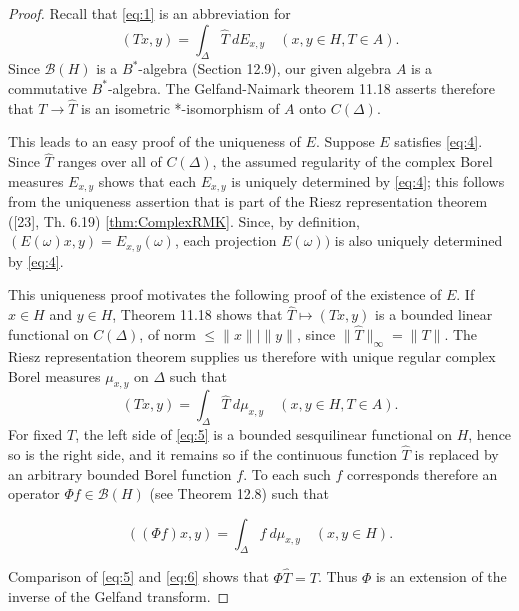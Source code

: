 \begin{proof}
  Recall that \eqref{eq:1} is an abbreviation for
  \begin{equation}
    \label{eq:4}
    (Tx , y) = \int_\Delta \widehat{T} \ dE_{x,y} \quad (x,y \in H, T \in A).
  \end{equation}
  Since $\mathcal{B}(H)$ is a $B^*$-algebra (Section 12.9), our given algebra $A$ is a commutative $B^*$-algebra.
  The Gelfand-Naimark theorem 11.18 asserts therefore that $T \to \widehat{T}$ is an isometric *-isomorphism of $A$ onto $C(\Delta)$.

  This leads to an easy proof of the uniqueness of $E$.
  Suppose $E$ satisfies \eqref{eq:4}.
  Since $\widehat{T}$ ranges over all of $C(\Delta)$, the assumed regularity of the complex Borel measures $E_{x,y}$ shows that each $E_{x,y}$ is uniquely determined by \eqref{eq:4}; this follows from the uniqueness assertion that is part of the Riesz representation theorem ([23], Th. 6.19) \ref{thm:ComplexRMK}.
  Since, by definition, $(E(\omega)x, y) = E_{x,y}(\omega)$, each projection $E(\omega))$ is also uniquely determined by \eqref{eq:4}.

  This uniqueness proof motivates the following proof of the existence of $E$.
  If $x \in H$ and $y \in H$, Theorem 11.18 shows that $ \widehat{T} \mapsto (Tx, y)$ is a bounded linear functional on $C(\Delta)$, of norm $\leq \|x\|| \|y\|$, since $\| \widehat{T}\|_{\infty} = \|T\|$.
  The Riesz representation theorem supplies us therefore with unique regular complex Borel measures $\mu_{x,y}$ on $\Delta$ such that
  \begin{equation}
    \label{eq:5}
    (Tx , y) = \int_\Delta \widehat{T} \ d\mu_{x,y} \quad (x,y \in H, T \in A).
  \end{equation}
  For fixed \( T \), the left side of \eqref{eq:5} is a bounded sesquilinear functional on \( H \), hence so is the right side, and it remains so if the continuous function
  \( \widehat{T} \) is replaced by an arbitrary bounded Borel function \( f \).
  To each such \( f \) corresponds therefore an operator \( \Phi f \in \mathcal{B}(H) \) (see Theorem 12.8) such that

  \begin{equation}
    \label{eq:6}
    ((\Phi f)x, y) = \int_{\Delta} f \ d\mu_{x,y} \quad (x, y \in H).
  \end{equation}

  Comparison of \eqref{eq:5} and \eqref{eq:6} shows that \( \Phi \hat{T} = T \). Thus \( \Phi \) is an extension of the inverse of the Gelfand transform.


\end{proof}
